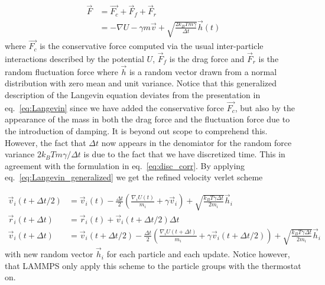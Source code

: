 \begin{align}
  \vec{F} &= \vec{F_c} + \vec{F}_{f} + \vec{F}_{r} \nonumber \\
  &= -\nabla U - \gamma m \vec{v} + \sqrt{\frac{2 k_B T m \gamma}{\Delta t}}\vec{h}(t)
  \label{eq:Langevin_generalized}
\end{align}
where $\vec{F_c}$ is the conservative force computed via the usual inter-particle interactions described by the potential $U$, $\vec{F}_f$ is the drag force and $\vec{F}_r$ is the random fluctuation force where $\vec{h}$ is a random vector drawn from a normal distribution with zero mean and unit variance. Notice that this generalized description of the Langevin equation deviates from the presentation in eq.~\eqref{eq:Langevin} since we have added the conservative force $\vec{F_c}$, but also by the appearance of the mass in both the drag force and the fluctuation force due to the introduction of damping. It is beyond out scope to comprehend this. However, the fact that $\Delta t$ now appears in the denomiator for the random force variance $2k_B T m \gamma / \Delta t$ is due to the fact that we have discretized time. This in agreement with the formulation in eq.~\eqref{eq:disc_corr}. By applying eq.~\eqref{eq:Langevin_generalized} we get the refined velocity verlet scheme


\begin{align*}
  \vec{v}_i(t + \Delta t/2)  &= \vec{v}_i(t) - \frac{\Delta t}{2}\left(\frac{\nabla_i U(t)}{m_i} + \gamma \vec{v}_i \right) + \sqrt{\frac{k_B T \gamma \Delta t}{2m_i}} \vec{h}_i \\ 
  \vec{r}_i(t + \Delta t) &= \vec{r}_i(t) + \vec{v}_i(t + \Delta t/2) \Delta t \\
  \vec{v}_i(t + \Delta t) &= \vec{v}_i(t+ \Delta t/2) - \frac{\Delta t}{2}\left(\frac{\nabla_i U(t + \Delta t)}{m_i} + \gamma \vec{v}_i(t + \Delta t/2) \right) + \sqrt{\frac{k_B T \gamma \Delta t}{2m_i}} \vec{h}_i
\end{align*}
with new random vector $\vec{h}_i$ for each particle and each update. Notice however, that LAMMPS only apply this scheme to the particle groups with the thermostat on. 



